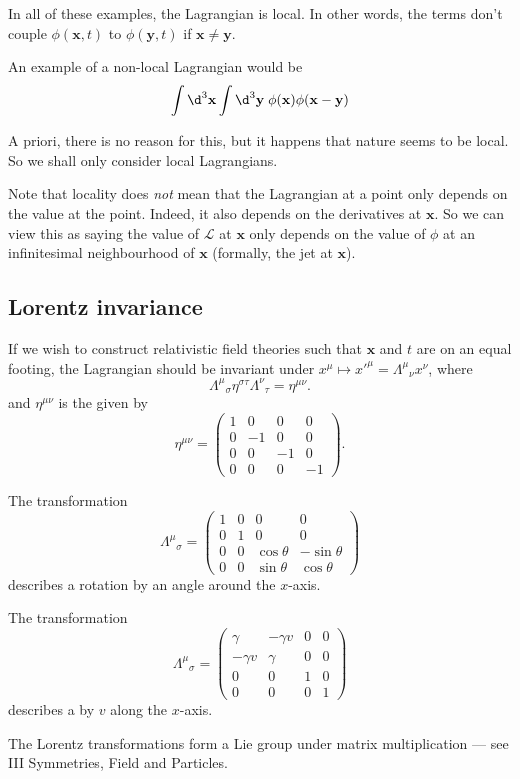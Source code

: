 \documentclass[a4paper]{article}
\begin{document}
In all of these examples, the Lagrangian is local. In other words, the terms don't couple $\phi(\mathbf{x}, t)$ to $\phi(\mathbf{y}, t)$ if $\mathbf{x} \not= \mathbf{y}$.
\begin{eg}
  An example of a non-local Lagrangian would be
  \[
    \int \d^3 \mathbf{x} \int \d^3 \mathbf{y} \; \phi(\mathbf{x}) \phi(\mathbf{x} - \mathbf{y})
  \]
\end{eg}
A priori, there is no reason for this, but it happens that nature seems to be local. So we shall only consider local Lagrangians.

Note that locality does \emph{not} mean that the Lagrangian at a point only depends on the value at the point. Indeed, it also depends on the derivatives at $\mathbf{x}$. So we can view this as saying the value of $\mathcal{L}$ at $\mathbf{x}$ only depends on the value of $\phi$ at an infinitesimal neighbourhood of $\mathbf{x}$ (formally, the jet at $\mathbf{x}$).

\subsection{Lorentz invariance}
If we wish to construct relativistic field theories such that $\mathbf{x}$ and $t$ are on an equal footing, the Lagrangian should be invariant under  $x^\mu \mapsto x'^\mu = \Lambda^\mu\!_\nu x^\nu$, where
\[
  \Lambda^\mu\!_\sigma \eta^{\sigma\tau} \Lambda^\nu\!_\tau = \eta^{\mu\nu}.
\]
and $\eta^{\mu\nu}$ is the  given by
\[
  \eta^{\mu\nu} =
  \begin{pmatrix}
    1 & 0 & 0 & 0\\
    0 & -1 & 0 & 0\\
    0 & 0 & -1 & 0\\
    0 & 0 & 0 & -1
  \end{pmatrix}.
\]

\begin{eg}
  The transformation
  \[
    \Lambda^\mu\!_\sigma =
    \begin{pmatrix}
      1 & 0 & 0 & 0\\
      0 & 1 & 0 & 0\\
      0 & 0 & \cos \theta & -\sin \theta\\
      0 & 0 & \sin \theta & \cos \theta
    \end{pmatrix}
  \]
  describes a rotation by an angle around the $x$-axis.
\end{eg}

\begin{eg}
  The transformation
  \[
    \Lambda^\mu\!_\sigma =
    \begin{pmatrix}
      \gamma & -\gamma v & 0 & 0\\
      -\gamma v & \gamma & 0 & 0\\
      0 & 0 & 1 & 0\\
      0 & 0 & 0 & 1
    \end{pmatrix}
  \]
  describes a  by $v$ along the $x$-axis.
\end{eg}
The Lorentz transformations form a Lie group under matrix multiplication --- see III Symmetries, Field and Particles.
\end{document}
